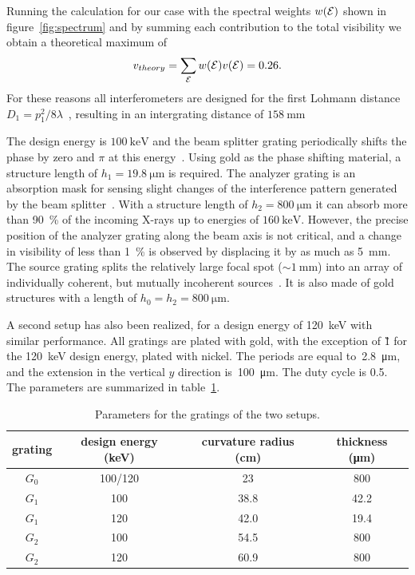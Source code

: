 Running the calculation for our case with the spectral weights $w(\mathcal{E})$ shown in
figure~\ref{fig:spectrum} and by summing each contribution to the total
visibility we obtain a theoretical maximum of
\begin{equation}
    v_{theory} = \sum_{\mathcal{E}} w(\mathcal{E})v(\mathcal{E}) = 0.26.
    \label{eq:maximum.visibility}
\end{equation}
For these reasons all interferometers are designed for the first Lohmann
distance $D_1 = p_1^2 / 8 \lambda$~\parencite{Weitkamp2005}, resulting in an
intergrating distance of $\SI{158}{\milli\metre}$

The design energy is $\SI{100}{\kilo\electronvolt}$ and the beam splitter
grating periodically shifts the phase by zero and $\pi$ at this
energy~\parencite{David2002}. Using
gold as the phase shifting material, a structure length of
$h_1 = \SI{19.8}{\micro \metre}$ is required. The analyzer grating is an absorption mask
for sensing slight changes of the interference pattern generated by the beam
splitter~\parencite{Momose2003a}. With a structure length of $h_2 =
\SI{800}{\micro \metre}$
it can absorb more than \SI{90}{\percent} of the incoming X-rays up to energies of 
$\SI{160}{\kilo\electronvolt}$. However,
the precise position of the analyzer grating along the beam axis is not
critical, and a change in visibility of less than \SI{1}{\percent} is
observed by displacing it by as much as \SI{5}{\milli\metre}. The
source grating splits the relatively large focal spot ($\sim
\SI{1}{\milli\metre}$) into an array of individually coherent, but mutually
incoherent sources~\parencite{Pfeiffer2006}. It is also made of gold structures
with a length of $h_0 = h_2 = \SI{800}{\micro \metre}$.

A second setup has also been realized, for a design energy of
\SI{120}{\kilo\eV} with similar performance. All gratings are plated with
gold, with the exception of \G1 for the \SI{120}{\kilo\eV}
design energy, plated with nickel. The periods are equal
to~\SI{2.8}{\micro\metre}, and the extension in
the vertical $y$ direction is~\SI{100}{\micro\metre}. The 
duty cycle is 0.5. The parameters are summarized in
table~\ref{tab:gratings}.

\begin{table}[htb]
    \centering
    \begin{tabular}{*4c}
        \toprule
        grating & design energy (\si{\kilo\eV}) & curvature radius
        (\si{\centi\metre}) & thickness (\si{\micro\metre}) \\
        \midrule
        $G_0$ & \num{100}/\num{120} & \num{23} & \num{800} \\
        $G_1$ & \num{100} & \num{38.8} & \num{42.2} \\
        $G_1$ & \num{120} & \num{42.0} & \num{19.4} \\
        $G_2$ & \num{100} & \num{54.5} & \num{800} \\
        $G_2$ & \num{120} & \num{60.9} & \num{800} \\
        \bottomrule
    \end{tabular}
    \caption{Parameters for the gratings of the two setups.}
    \label{tab:gratings}
\end{table}

